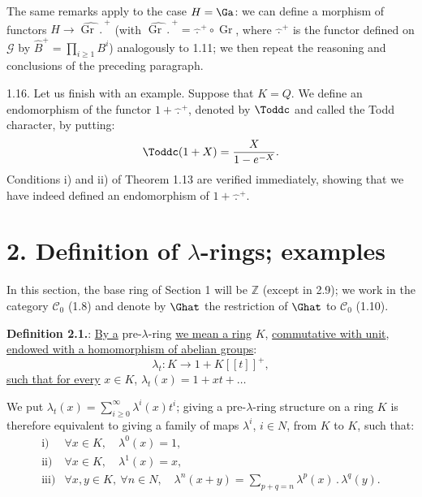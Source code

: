 The same remarks apply to the case \(H=\Ga\): we can define a morphism of functors \(H\longrightarrow\widehat{\operatorname{Gr}\,\mathord{.}\,}^{+}\) (with \(\widehat{\operatorname{Gr}\,\mathord{.}\,}^{+}=\widehat{\,\mathord{.}\,}^{+}\circ\operatorname{Gr}\), where \(\widehat{\,\mathord{.}\,}^{+}\) is the functor defined on \(\mathcal G\) by \(\widehat B^+=\prod_{i\geq1}B^i\)) analogously to 1.11; we then repeat the reasoning and conclusions of the preceding paragraph.

1.16. Let us finish with an example. Suppose that \(K=Q\). We define an endomorphism of the functor \(1+\widehat{\,\mathord{.}\,}^{+}\), denoted by \(\Toddc\) and called the Todd character, by putting:
\[
  \Toddc(1+X)=\frac{X}{1-e^{-X}}.
\]
Conditions i) and ii) of Theorem 1.13 are verified immediately, showing that we have indeed defined an endomorphism of \(1+\widehat{\,\mathord{.}\,}^{+}\).

\section*{2. Definition of \(\lambda\)-rings; examples}

In this section, the base ring of Section 1 will be \(\mathbb Z\) (except in 2.9); we work in the category \(\mathcal C_0\) (1.8) and denote by \(\Ghat\) the restriction of \(\Ghat\) to \(\mathcal C_0\) (1.10).

%
\textbf{Definition 2.1.}: \uline{By a} pre-\(\lambda\)-ring \uline{we mean a ring} \(K\), \uline{commutative with unit}, \uline{endowed with a homomorphism of abelian groups}:
\[
  \lambda_t:K\longrightarrow1+K[[t]]^+,
\]
\uline{such that for every} \(x\in K\), \(\lambda_t(x)=1+xt+\ldots\)

We put \(\lambda_t(x)=\sum_{i\geq0}^{\infty}\lambda^i(x)t^i\); giving a pre-\(\lambda\)-ring structure on a ring \(K\) is therefore equivalent to giving a family of maps \(\lambda^i\), \(i\in N\), from \(K\) to \(K\), such that:
\[
\begin{array}{ll}
\text{i)}& \forall x\in K,\quad \lambda^0(x)=1,\\[0.3em]
\text{ii)}& \forall x\in K,\quad \lambda^1(x)=x,\\[0.3em]
\text{iii)}& \forall x,y\in K,\ \forall n\in N,\quad
\lambda^n(x+y)=\displaystyle\sum_{p+q=n}\lambda^p(x)\mathbin{.}\lambda^q(y).
\end{array}
\]

